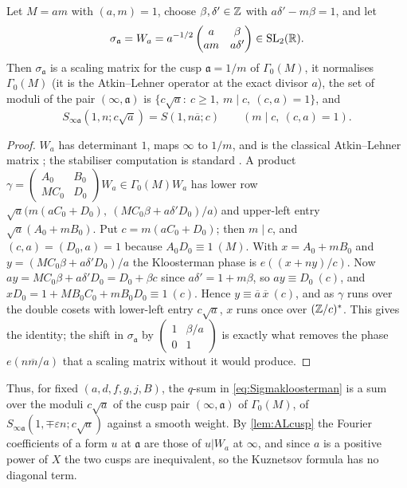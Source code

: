 \documentclass[11pt,colorlinks]{charlie}
\begin{document}
\begin{lemma}\label{lem:ALcusp}
Let $M=am$ with $(a,m)=1$, choose $\beta,\delta'\in\mathbb{Z}$ with $a\delta'-m\beta=1$, and let
\[
 \sigma_{\mathfrak a}=W_a=a^{-1/2}\begin{pmatrix}a&\beta\\ am&a\delta'\end{pmatrix}\in\mathrm{SL}_2(\mathbb{R}).
\]
Then $\sigma_{\mathfrak a}$ is a scaling matrix for the cusp $\mathfrak a=1/m$ of $\Gamma_0(M)$, it normalises $\Gamma_0(M)$ (it is the Atkin--Lehner operator at the exact divisor $a$), the set of moduli of the pair $(\infty,\mathfrak a)$ is $\{c\sqrt a:\ c\ge1,\ m\mid c,\ (c,a)=1\}$, and
\[
 S_{\infty\mathfrak a}(1,n;c\sqrt a)=S(1,n\overline a;c)\qquad(m\mid c,\ (c,a)=1).
\]
\end{lemma}
\begin{proof}
$W_a$ has determinant $1$, maps $\infty$ to $1/m$, and is the classical Atkin--Lehner matrix \cite{AtkinLehner}; the stabiliser computation is standard \cite[\S2.3]{IwSpec}. A product $\gamma=\begin{pmatrix}A_0&B_0\\ MC_0&D_0\end{pmatrix}W_a\in\Gamma_0(M)W_a$ has lower row $\sqrt a\big(m(aC_0+D_0),\ (MC_0\beta+a\delta'D_0)/a\big)$ and upper-left entry $\sqrt a(A_0+mB_0)$. Put $c=m(aC_0+D_0)$; then $m\mid c$, and $(c,a)=(D_0,a)=1$ because $A_0D_0\equiv1\ (M)$. With $x=A_0+mB_0$ and $y=(MC_0\beta+a\delta'D_0)/a$ the Kloosterman phase is $e((x+ny)/c)$. Now $ay=MC_0\beta+a\delta'D_0=D_0+\beta c$ since $a\delta'=1+m\beta$, so $ay\equiv D_0\ (c)$, and $xD_0=1+M B_0C_0+mB_0D_0\equiv1\ (c)$. Hence $y\equiv\overline a\,\overline x\ (c)$, and as $\gamma$ runs over the double cosets with lower-left entry $c\sqrt a$, $x$ runs once over $(\mathbb{Z}/c)^*$. This gives the identity; the shift in $\sigma_{\mathfrak a}$ by $\begin{pmatrix}1&\beta/a\\0&1\end{pmatrix}$ is exactly what removes the phase $e(n\overline m/a)$ that a scaling matrix without it would produce.
\end{proof}

Thus, for fixed $(a,d,f,g,j,B)$, the $q$-sum in \eqref{eq:Sigmakloosterman} is a sum over the moduli $c\sqrt a$ of the cusp pair $(\infty,\mathfrak a)$ of $\Gamma_0(M)$, of $S_{\infty\mathfrak a}(1,\mp\varepsilon n;c\sqrt a)$ against a smooth weight. By \cref{lem:ALcusp} the Fourier coefficients of a form $u$ at $\mathfrak a$ are those of $u|W_a$ at $\infty$, and since $a$ is a positive power of $X$ the two cusps are inequivalent, so the Kuznetsov formula has no diagonal term.
\end{document}
